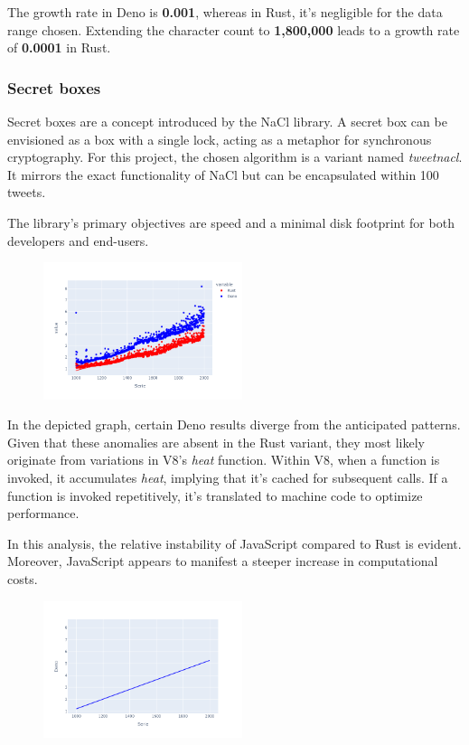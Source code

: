 \documentclass[10pt,journal,compsoc]{IEEEtran}
\begin{document}
The growth rate in Deno is \textbf{0.001}, whereas in Rust, it's negligible for the data range chosen. Extending the character count to \textbf{1,800,000} leads to a growth rate of \textbf{0.0001} in Rust.

\subsubsection{Secret boxes}

Secret boxes are a concept introduced by the NaCl library. A secret box can be envisioned as a box with a single lock, acting as a metaphor for synchronous cryptography. For this project, the chosen algorithm is a variant named \textit{tweetnacl}. It mirrors the exact functionality of NaCl but can be encapsulated within 100 tweets.

The library's primary objectives are speed and a minimal disk footprint for both developers and end-users.

\begin{figure}[H]
    \centering
    \includegraphics[width=0.52\textwidth]{images/secretbox_lines}
\end{figure}

In the depicted graph, certain Deno results diverge from the anticipated patterns. Given that these anomalies are absent in the Rust variant, they most likely originate from variations in V8's \textit{heat} function. Within V8, when a function is invoked, it accumulates \textit{heat}, implying that it's cached for subsequent calls. If a function is invoked repetitively, it's translated to machine code to optimize performance.

In this analysis, the relative instability of JavaScript compared to Rust is evident. Moreover, JavaScript appears to manifest a steeper increase in computational costs.

\begin{figure}[H]
    \centering
    \includegraphics[width=0.52\textwidth]{trend_secretbox_deno}
\end{figure}
\end{document}
